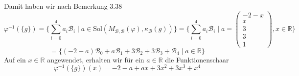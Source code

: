 \documentclass[a4paper,graphics,11pt]{article}
\begin{document}
Damit haben wir nach Bemerkung 3.38
$$
    \varphi^{-1}(\{g\})
    = \{\sum_{i=0}^{4} a_i\mathcal{B}_i \mid a \in \text{Sol}(M_{\mathcal{B}, \mathcal{B}}(\varphi), \kappa_{\mathcal{B}}(g))\}
    = \{\sum_{i=0}^{4} a_i\mathcal{B}_i \mid a
    =\begin{pmatrix}
        -2-x\\
        x\\
        3\\
        3\\
        1
    \end{pmatrix}, x \in \mathbb{R}
    \}
$$$$
    = \{(-2-a)\mathcal{B}_0+a\mathcal{B}_1+3\mathcal{B}_2+3\mathcal{B}_3+\mathcal{B}_4 \mid a \in \mathbb{R}\}
$$
Auf ein $x \in \mathbb{R}$ angewendet, erhalten wir für ein $a \in \mathbb{R}$ die Funktionenschaar
$$
    \varphi^{-1}(\{g\})(x) = -2-a+ax+3x^2+3x^3+x^4
$$
\end{document}
